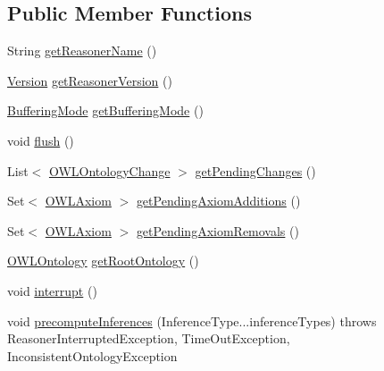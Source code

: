 \subsection*{Public Member Functions}
\begin{DoxyCompactItemize}
\item 
String \hyperlink{interfaceorg_1_1semanticweb_1_1owlapi_1_1reasoner_1_1_o_w_l_reasoner_aff24920cf79877b047e609cd66a0f836}{get\-Reasoner\-Name} ()
\item 
\hyperlink{classorg_1_1semanticweb_1_1owlapi_1_1util_1_1_version}{Version} \hyperlink{interfaceorg_1_1semanticweb_1_1owlapi_1_1reasoner_1_1_o_w_l_reasoner_a02ef217036ccf5a0490ec63f4a94685d}{get\-Reasoner\-Version} ()
\item 
\hyperlink{enumorg_1_1semanticweb_1_1owlapi_1_1reasoner_1_1_buffering_mode}{Buffering\-Mode} \hyperlink{interfaceorg_1_1semanticweb_1_1owlapi_1_1reasoner_1_1_o_w_l_reasoner_a6a8ee6eda3b5bd2c2bb48354c1fa5d92}{get\-Buffering\-Mode} ()
\item 
void \hyperlink{interfaceorg_1_1semanticweb_1_1owlapi_1_1reasoner_1_1_o_w_l_reasoner_ad2d99b8530c4b07c34ff11fdc02a8979}{flush} ()
\item 
List$<$ \hyperlink{classorg_1_1semanticweb_1_1owlapi_1_1model_1_1_o_w_l_ontology_change}{O\-W\-L\-Ontology\-Change} $>$ \hyperlink{interfaceorg_1_1semanticweb_1_1owlapi_1_1reasoner_1_1_o_w_l_reasoner_ad6a5d2ce0b3cc695535c803b3a19eef0}{get\-Pending\-Changes} ()
\item 
Set$<$ \hyperlink{interfaceorg_1_1semanticweb_1_1owlapi_1_1model_1_1_o_w_l_axiom}{O\-W\-L\-Axiom} $>$ \hyperlink{interfaceorg_1_1semanticweb_1_1owlapi_1_1reasoner_1_1_o_w_l_reasoner_af1eaa30a1a5a96e7702666ba9b57b39b}{get\-Pending\-Axiom\-Additions} ()
\item 
Set$<$ \hyperlink{interfaceorg_1_1semanticweb_1_1owlapi_1_1model_1_1_o_w_l_axiom}{O\-W\-L\-Axiom} $>$ \hyperlink{interfaceorg_1_1semanticweb_1_1owlapi_1_1reasoner_1_1_o_w_l_reasoner_ae1d4e62a022475acab83d4e6e1871e25}{get\-Pending\-Axiom\-Removals} ()
\item 
\hyperlink{interfaceorg_1_1semanticweb_1_1owlapi_1_1model_1_1_o_w_l_ontology}{O\-W\-L\-Ontology} \hyperlink{interfaceorg_1_1semanticweb_1_1owlapi_1_1reasoner_1_1_o_w_l_reasoner_a4b37e37c20004f092407b47ad74cab11}{get\-Root\-Ontology} ()
\item 
void \hyperlink{interfaceorg_1_1semanticweb_1_1owlapi_1_1reasoner_1_1_o_w_l_reasoner_a3062d390ff3ba053d7abb2fcd169e357}{interrupt} ()
\item 
void \hyperlink{interfaceorg_1_1semanticweb_1_1owlapi_1_1reasoner_1_1_o_w_l_reasoner_a549c2f8a03601b105283f54756f9a0bb}{precompute\-Inferences} (Inference\-Type...\-inference\-Types)  throws Reasoner\-Interrupted\-Exception, Time\-Out\-Exception, Inconsistent\-Ontology\-Exception

\end{DoxyCompactItemize}
